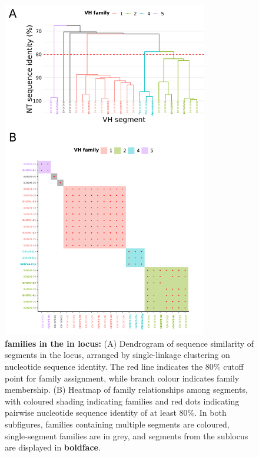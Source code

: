 	
	\begin{figure}
	\centering
	\begin{subfigure}{0em}
    \label{fig:nfu-vh-families-a}
    \end{subfigure}
    \begin{subfigure}{0em}
    \label{fig:nfu-vh-families-b}
    \end{subfigure}
	\includegraphics[width=0.8\textwidth]{_Figures/png/nfu-vh-families.png}
	\caption[\vh families in the in \Nfu \igh{} locus]{\textbf{\vh families in the in \Nfu \igh{} locus:} (A) Dendrogram of sequence similarity of \vh segments in the \Nfu \igh{} locus, arranged by single-linkage clustering on nucleotide sequence identity. The red line indicates the 80\% cutoff point for family assignment, while branch colour indicates family membership. (B) Heatmap of family relationships among \Nfu \vh segments, with coloured shading indicating families and red dots indicating pairwise nucleotide sequence identity of at least 80\%. In both subfigures, \vh families containing multiple segments are coloured, single-segment families are in grey, and segments from the  sublocus are displayed in \textbf{boldface}.}
	\label{fig:nfu-vh-families}
	\end{figure}

